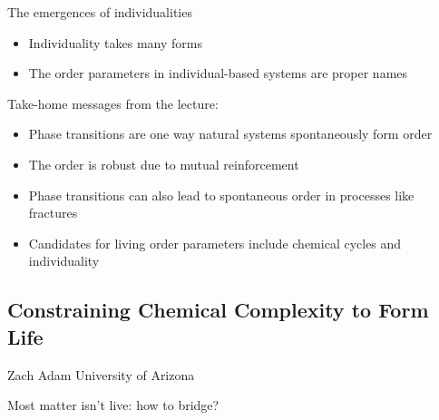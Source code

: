 \documentclass[]{article}
\begin{document}
The emergences of individualities
\begin{itemize}
	\item Individuality takes many 	forms
	\item The order parameters in individual-based systems 	are proper names
\end{itemize}

Take-home messages from the lecture:
\begin{itemize}
	\item Phase transitions are one way natural systems  spontaneously form order
	\item The order is robust due to mutual reinforcement
	\item Phase transitions can also lead to spontaneous order in processes like fractures
	\item Candidates for living order parameters include chemical cycles and individuality
\end{itemize}

\subsection{Constraining Chemical Complexity to Form Life}

Zach Adam
University of Arizona

Most matter isn't live: how to bridge?
\end{document}

